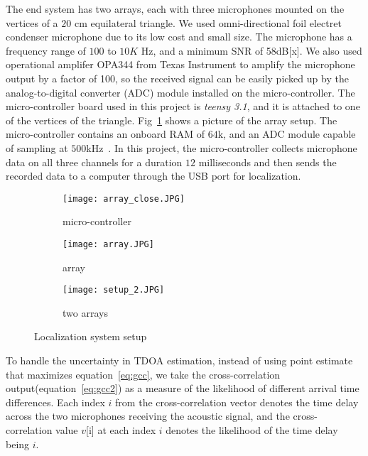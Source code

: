 The end system has two arrays, each with three microphones mounted on the vertices of a $20$ cm equilateral triangle. We used omni-directional foil electret condenser microphone due to its low cost and small size. The microphone has a frequency range of $100$ to $10K$ Hz, and a minimum SNR of 58dB[x]. We also used operational amplifer OPA344 from Texas Instrument to amplify the microphone output by a factor of 100, so the received signal can be easily picked up by the analog-to-digital converter (ADC) module installed on the micro-controller. The micro-controller board used in this project is \emph{teensy 3.1}, and it is attached to one of the vertices of the triangle. Fig~\ref{fig:setup_array} shows a picture of the array setup.  The micro-controller contains an onboard RAM of $64$k, and an ADC module capable of sampling at $500$kHz~\cite{tdoa:micloc, sys:teensy}. In this project, the micro-controller collects microphone data on all three channels for a duration $12$ milliseconds and then sends the recorded data to a computer through the USB port for localization. 

\begin{figure}[h!]
  \centering
  \begin{subfigure}[]{.48\textwidth}
    \texttt{[image: array\_close.JPG]}
    \caption{micro-controller}
  \end{subfigure}
  \begin{subfigure}[]{.48\textwidth}
    \texttt{[image: array.JPG]}
    \caption{array}
  \end{subfigure}
  \begin{subfigure}[]{.48\textwidth}
    \texttt{[image: setup\_2.JPG]}
    \caption{two arrays}
  \end{subfigure}
  \caption{Localization system setup}
  \label{fig:setup_array}
\end{figure}

To handle the uncertainty in TDOA estimation, instead of using point estimate that maximizes equation~\ref{eq:gcc}, we take the cross-correlation output(equation~\ref{eq:gcc2}) as a measure of the likelihood of different arrival time differences. Each index $i$ from the cross-correlation vector denotes the time delay across the two microphones receiving the acoustic signal, and the cross-correlation value $v$[i] at each index $i$ denotes the likelihood of the time delay being $i$. 

